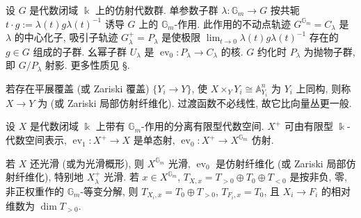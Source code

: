 \begin{example}[中心化子与抛物子群]\label{src:7.8.8}
设 $G$ 是代数闭域 $\Bbbk$ 上的仿射代数群. 单参数子群 $\lambda:\mathbb G_m\to G$ 按共轭 $t\cdot g:=\lambda(t)g\lambda(t)^{-1}$ 诱导 $G$ 上的 $\mathbb G_m$-作用. 此作用的不动点轨迹 $G^{\mathbb G_m}=C_\lambda$ 是 $\lambda$ 的中心化子, 吸引子轨迹 $G_\lambda^+=P_\lambda$ 是使极限 $\lim_{t\to0}\lambda(t)g\lambda(t)^{-1}$ 存在的 $g\in G$ 组成的子群. 幺幂子群 $U_\lambda$ 是 $\operatorname{ev}_0:P_\lambda\to C_\lambda$ 的核. $G$ 约化时 $P_\lambda$ 为抛物子群, 即 $G/P_\lambda$ 射影. 更多性质见 \S{}.
\end{example}
若存在平展覆盖 (或 Zariski 覆盖) $\{Y_i\to Y\}$, 使 $X\times_YY_i\cong\mathbb A_{Y_i}^n$ 为 $Y_i$ 上同构, 则称 $X\to Y$ 为 (或 Zariski 局部仿射纤维化). 过渡函数不必线性, 故它比向量丛更一般.
\begin{theorem}\label{src:7.8.9}
设 $X$ 是代数闭域 $\Bbbk$ 上带有 $\mathbb G_m$-作用的分离有限型代数空间. $X^+$ 可由有限型 $\Bbbk$-代数空间表示, $\operatorname{ev}_1:X^+\to X$ 是单态射, $\operatorname{ev}_0:X^+\to X^{\mathbb G_m}$ 仿射.

若 $X$ 还光滑 (或为光滑概形), 则 $X^{\mathbb G_m}$ 光滑, $\operatorname{ev}_0$ 是仿射纤维化 (或 Zariski 局部仿射纤维化), 特别地 $X_\lambda^+$ 光滑. 若 $x\in X^{\mathbb G_m}$, $T_{X,x}=T_{>0}\oplus T_0\oplus T_{<0}$ 是按非负, 零, 非正权重作的 $\mathbb G_m$-等变分解, 则 $T_{X_i,x}=T_0\oplus T_{>0}$, $T_{F_i,x}=T_0$, 且 $X_i\to F_i$ 的相对维数为 $\dim T_{>0}$.
\end{theorem}
